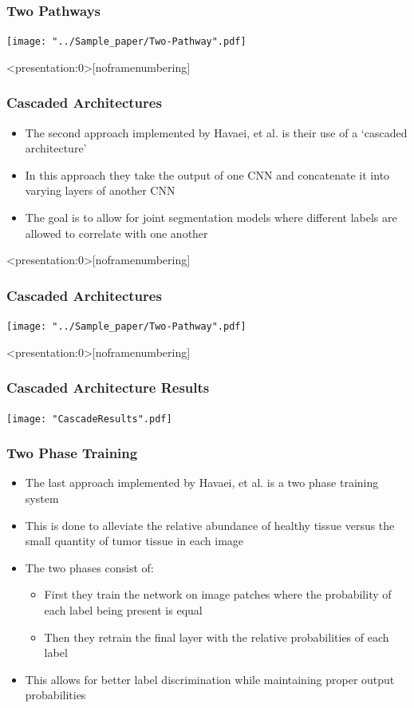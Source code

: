 \documentclass{beamer}
\begin{document}
\begin{frame}
  \frametitle{Two Pathways}
  \texttt{[image: "../Sample\_paper/Two-Pathway".pdf]}
  \\
\end{frame}

\begin{frame}<presentation:0>[noframenumbering]
  \frametitle{Cascaded Architectures}
  \begin{itemize}
	\item The second approach implemented by Havaei, et al. is their use of a `cascaded architecture'
	\item In this approach they take the output of one CNN and concatenate it into varying layers of another CNN
	\item The goal is to allow for joint segmentation models where different labels are allowed to correlate with one another
  \end{itemize}
\end{frame}

\begin{frame}<presentation:0>[noframenumbering]
  \frametitle{Cascaded Architectures}
  \texttt{[image: "../Sample\_paper/Two-Pathway".pdf]}
  \\
\end{frame}

\begin{frame}<presentation:0>[noframenumbering]
  \frametitle{Cascaded Architecture Results}
  \texttt{[image: "CascadeResults".pdf]}
  \\
\end{frame}

\begin{frame}
  \frametitle{Two Phase Training}
  \begin{itemize}
	\item The last approach implemented by Havaei, et al. is a two phase training system
	\item This is done to alleviate the relative abundance of healthy tissue versus the small quantity of tumor tissue in each image
	\item The two phases consist of:
	\begin{itemize}
	  \item First they train the network on image patches where the probability of each label being present is equal
	  \item Then they retrain the final layer with the relative probabilities of each label
	\end{itemize}
	\item This allows for better label discrimination while maintaining proper output probabilities
  \end{itemize}
\end{frame}
\end{document}
